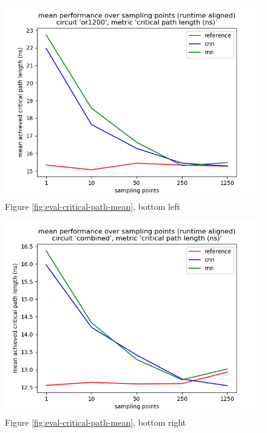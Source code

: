 \begin{figure}[H]
	\includegraphics[width=\linewidth]{plots/eval-or1200-critical-path-mean-full.png}
	\caption{Figure \ref{fig:eval-critical-path-mean}, bottom left}
\end{figure}

\begin{figure}[H]
	\includegraphics[width=\linewidth]{plots/eval-combined-critical-path-mean-full.png}
	\caption{Figure \ref{fig:eval-critical-path-mean}, bottom right}
\end{figure}

